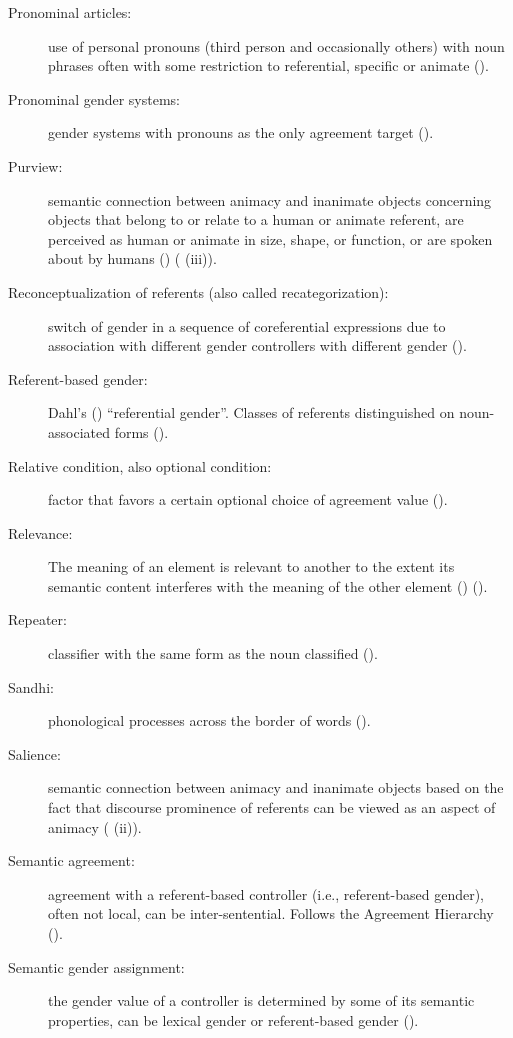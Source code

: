 \documentclass[output=collectionpaper]{langsci/langscibook}
\begin{document}
{\begin{description}
\item  [Pronominal articles:] use of personal pronouns (third person and occasionally others) with noun phrases often with some restriction to referential, specific or animate ().
\item  [Pronominal gender systems:] gender systems with pronouns as the only agreement target ().
\item  [Purview:] semantic connection between animacy and inanimate objects concerning objects that belong to or relate to a human or animate referent, are perceived as human or animate in size, shape, or function, or are spoken about by humans (\citealt{Gerdts2013}) ( (iii)).
%
\item  [Reconceptualization of referents (also called recategorization):] switch of gender in a sequence of coreferential expressions due to association with different gender controllers with different gender ().
\item  [Referent-based gender:] Dahl’s (\citealt*{Dahl2000a}) “referential gender”. Classes of referents distinguished on noun-associated forms ().
\item  [Relative condition, also optional condition:] factor that favors a certain optional choice of agreement value ().
\item  [Relevance:] The meaning of an element is relevant to another to the extent its semantic content interferes with the meaning of the other element (\citealt{Bybee1985a}) ().
\item  [Repeater:] classifier with the same form as the noun classified ().
\item  [Sandhi:] phonological processes across the border of words ().
\item  [Salience:] semantic connection between animacy and inanimate objects based on the fact that discourse prominence of referents can be viewed as an aspect of animacy ( (ii)).
\item  [Semantic agreement:] agreement with a referent-based controller (i.e., referent-based gender), often not local, can be inter-sentential. Follows the Agreement Hierarchy ().
\item  [Semantic gender assignment:] the gender value of a controller is determined by some of its semantic properties, can be lexical gender or referent-based gender ().

\end{description}}
\end{document}
